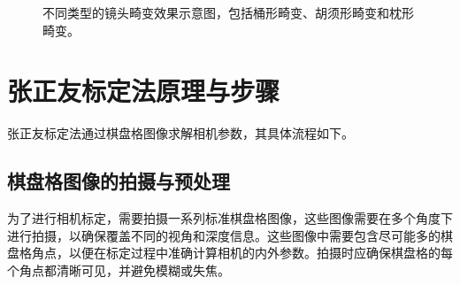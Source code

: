 \documentclass[hyperref,a4paper,UTF8]{ctexart}
\begin{document}
\begin{figure}[h]
    \centering
    \caption{不同类型的镜头畸变效果示意图，包括桶形畸变、胡须形畸变和枕形畸变。}
\end{figure}

\section{张正友标定法原理与步骤}

张正友标定法通过棋盘格图像求解相机参数，其具体流程如下。

\subsection{棋盘格图像的拍摄与预处理}

为了进行相机标定，需要拍摄一系列标准棋盘格图像，这些图像需要在多个角度下进行拍摄，以确保覆盖不同的视角和深度信息。这些图像中需要包含尽可能多的棋盘格角点，以便在标定过程中准确计算相机的内外参数。拍摄时应确保棋盘格的每个角点都清晰可见，并避免模糊或失焦。
\end{document}
